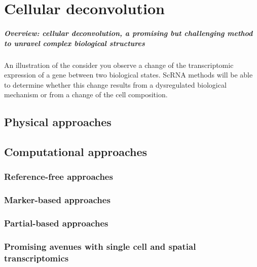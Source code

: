 \chapter{Cellular deconvolution}
\label{chap:deconvolution-state-of-the-art}
\paragraph{Overview: cellular deconvolution, a promising but challenging method to unravel complex biological structures}
An illustration of the  consider you observe a change of the transcriptomic expression of a gene between two biological states. ScRNA methods will be able to determine whether this change results from a dysregulated biological mechanism or from a change of the cell composition. 

\section{Physical approaches}


\section{Computational approaches}

\subsection{Reference-free approaches}

\subsection{Marker-based approaches}

\subsection{Partial-based approaches}

\subsection{Promising avenues with single cell and spatial transcriptomics}